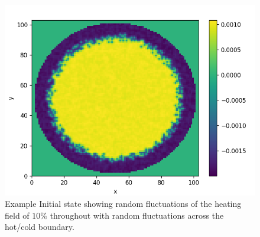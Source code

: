 \documentclass{article}
\begin{document}
\begin{figure}
	\centering
	\includegraphics[scale=1.5]{initialState.png}
	\caption{Example Initial state showing random fluctuations of the heating field of $10 \%$ throughout with random fluctuations across the hot/cold boundary. }
	\label{LBM initial state}
\end{figure}
\end{document}
